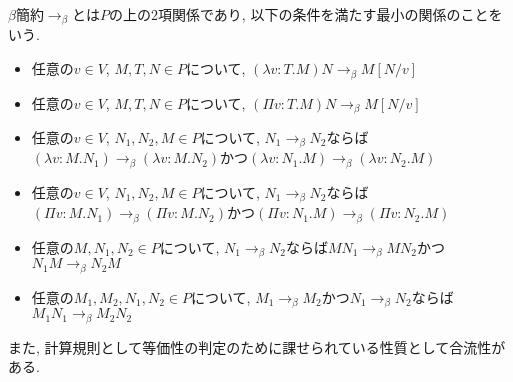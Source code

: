 \documentclass{ltjsarticle}
\begin{document}
\begin{defn}
 $\beta$簡約$\rightarrow_{\beta}$とは$P$の上の$2$項関係であり, 以下の条件を満たす最小の関係のことをいう.
 \begin{itemize}
  \item 任意の$v \in V$, $M, T, N \in P$について, $(\lambda v \colon T. M) N \rightarrow_\beta M[N/v]$
  \item 任意の$v \in V$, $M, T, N \in P$について, $(\Pi v \colon T. M) N \rightarrow_\beta M[N/v]$
  \item 任意の$v \in V$, $N_1, N_2, M \in P$について, $N_1 \rightarrow_\beta N_2$ならば$(\lambda v \colon M. N_1) \rightarrow_\beta (\lambda v \colon M. N_2)$かつ$(\lambda v \colon N_1 . M) \rightarrow_\beta (\lambda v \colon N_2 . M)$
  \item 任意の$v \in V$, $N_1, N_2, M \in P$について, $N_1 \rightarrow_\beta N_2$ならば$(\Pi v \colon M. N_1) \rightarrow_\beta (\Pi v \colon M. N_2)$かつ$(\Pi v \colon N_1 . M) \rightarrow_\beta (\Pi v \colon N_2 . M)$
  \item 任意の$M, N_1, N_2 \in P$について, $N_1 \rightarrow_\beta N_2$ならば$M N_1 \rightarrow_\beta M N_2$かつ$N_1 M \rightarrow_\beta N_2 M$
  \item 任意の$M_1, M_2, N_1, N_2 \in P$について, $M_1 \rightarrow_\beta M_2$かつ$N_1 \rightarrow_\beta N_2$ならば$M_1 N_1 \rightarrow_\beta M_2 N_2$
 \end{itemize}
\end{defn}

また, 計算規則として等価性の判定のために課せられている性質として合流性がある.
\end{document}
